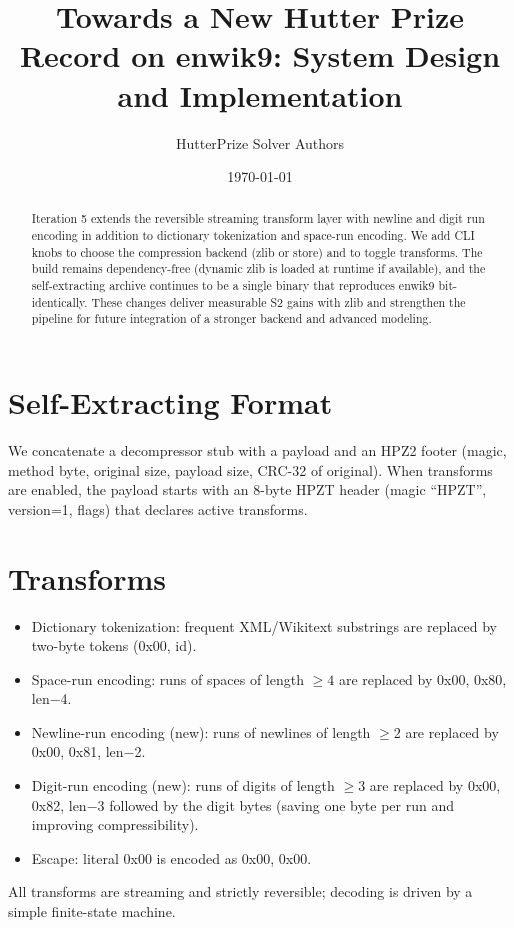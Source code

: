 \documentclass[11pt]{article}
\title{Towards a New Hutter Prize Record on enwik9: System Design and Implementation}
\author{HutterPrize Solver Authors}
\date{\today}
\begin{document}
\maketitle
\begin{abstract}
Iteration 5 extends the reversible streaming transform layer with newline and digit run encoding in addition to dictionary tokenization and space-run encoding. We add CLI knobs to choose the compression backend (zlib or store) and to toggle transforms. The build remains dependency-free (dynamic zlib is loaded at runtime if available), and the self-extracting archive continues to be a single binary that reproduces enwik9 bit-identically. These changes deliver measurable S2 gains with zlib and strengthen the pipeline for future integration of a stronger backend and advanced modeling.
\end{abstract}

\section{Self-Extracting Format}
We concatenate a decompressor stub with a payload and an HPZ2 footer (magic, method byte, original size, payload size, CRC-32 of original). When transforms are enabled, the payload starts with an 8-byte HPZT header (magic ``HPZT'', version=1, flags) that declares active transforms.

\section{Transforms}
\begin{itemize}[noitemsep]
  \item Dictionary tokenization: frequent XML/Wikitext substrings are replaced by two-byte tokens (0x00, id).
  \item Space-run encoding: runs of spaces of length \(\ge 4\) are replaced by 0x00, 0x80, len$-$4.
  \item Newline-run encoding (new): runs of newlines of length \(\ge 2\) are replaced by 0x00, 0x81, len$-$2.
  \item Digit-run encoding (new): runs of digits of length \(\ge 3\) are replaced by 0x00, 0x82, len$-$3 followed by the digit bytes (saving one byte per run and improving compressibility).
  \item Escape: literal 0x00 is encoded as 0x00, 0x00.
\end{itemize}
All transforms are streaming and strictly reversible; decoding is driven by a simple finite-state machine.
\end{document}
